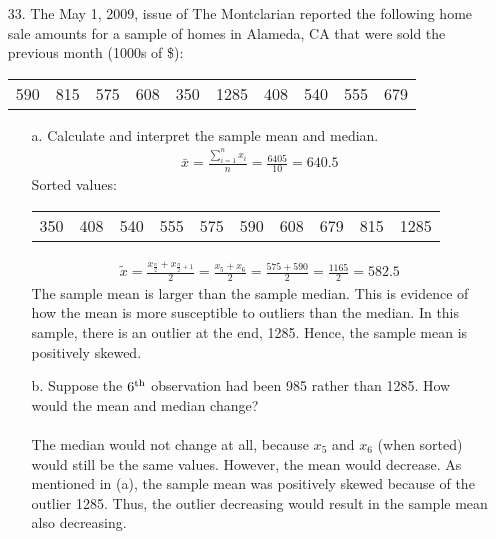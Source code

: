 \documentclass[letterpaper,12pt]{article}
\begin{document}
\maketitle

\begin{enumerate}
  \item[33.]
    The May 1, 2009, issue of The Montclarian reported the following home sale amounts for a sample of homes in Alameda, CA that were sold the previous month (1000s of \$):
    \begin{center}
      \begin{tabular}{cccccccccc}
        590 & 815 & 575 & 608 & 350 & 1285 & 408 & 540 & 555 & 679
      \end{tabular}
    \end{center}
    \begin{enumerate}
      \item[a.]
        Calculate and interpret the sample mean and median.
        \begin{align*}
          \bar{x} = \frac{\sum_{i=1}^{n} x_{i}}{n} = \frac{6405}{10} = 640.5
        \end{align*}
        Sorted values:
        \begin{center}
          \begin{tabular}{cccccccccc}
            350 & 408 & 540 & 555 & 575 & 590 & 608 & 679 & 815 & 1285
          \end{tabular}
        \end{center}
        \begin{align*}
          \tilde{x} = \frac{x_{\frac{n}{2}} + x_{\frac{n}{2} + 1}}{2} = \frac{x_{5} + x_{6}}{2} = \frac{575 + 590}{2} = \frac{1165}{2} = 582.5
        \end{align*}
        The sample mean is larger than the sample median. This is evidence of how the mean is more susceptible to outliers than the median. In this sample, there is an outlier at the end, 1285. Hence, the sample mean is positively skewed.
      \item[b.]
        Suppose the $6\textsuperscript{th}$ observation had been 985 rather than 1285. How would the mean and median change? \\ \\
        The median would not change at all, because $x_{5}$ and $x_{6}$ (when sorted) would still be the same values. However, the mean would decrease. As mentioned in (a), the sample mean was positively skewed because of the outlier 1285. Thus, the outlier decreasing would result in the sample mean also decreasing.

\end{enumerate}
\end{enumerate}
\end{document}
